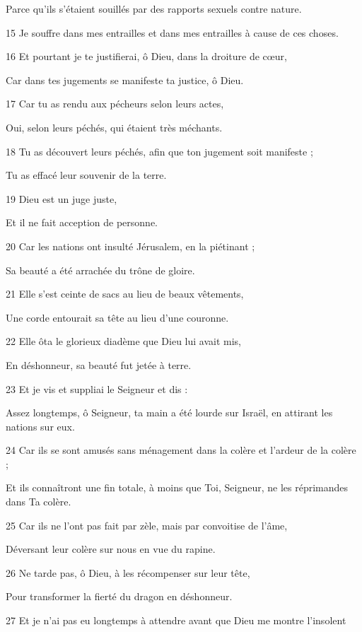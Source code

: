 \par     Parce qu'ils s'étaient souillés par des rapports sexuels contre nature.
\par 15 Je souffre dans mes entrailles et dans mes entrailles à cause de ces choses.
\par   
\par 16 Et pourtant je te justifierai, ô Dieu, dans la droiture de cœur,
\par     Car dans tes jugements se manifeste ta justice, ô Dieu.
\par 17 Car tu as rendu aux pécheurs selon leurs actes,
\par     Oui, selon leurs péchés, qui étaient très méchants.
\par 18 Tu as découvert leurs péchés, afin que ton jugement soit manifeste ;
\par     Tu as effacé leur souvenir de la terre.
\par 19 Dieu est un juge juste,
\par     Et il ne fait acception de personne.
\par 20 Car les nations ont insulté Jérusalem, en la piétinant ;
\par     Sa beauté a été arrachée du trône de gloire.
\par 21 Elle s'est ceinte de sacs au lieu de beaux vêtements,
\par     Une corde entourait sa tête au lieu d'une couronne.
\par 22 Elle ôta le glorieux diadème que Dieu lui avait mis,
\par     En déshonneur, sa beauté fut jetée à terre.
\par 23 Et je vis et suppliai le Seigneur et dis :
\par     Assez longtemps, ô Seigneur, ta main a été lourde sur Israël, en attirant les nations sur eux.
\par 24 Car ils se sont amusés sans ménagement dans la colère et l'ardeur de la colère ;
\par     Et ils connaîtront une fin totale, à moins que Toi, Seigneur, ne les réprimandes dans Ta colère.
\par 25 Car ils ne l'ont pas fait par zèle, mais par convoitise de l'âme,
\par     Déversant leur colère sur nous en vue du rapine.
\par 26 Ne tarde pas, ô Dieu, à les récompenser sur leur tête,
\par     Pour transformer la fierté du dragon en déshonneur.
\par 27 Et je n'ai pas eu longtemps à attendre avant que Dieu me montre l'insolent
